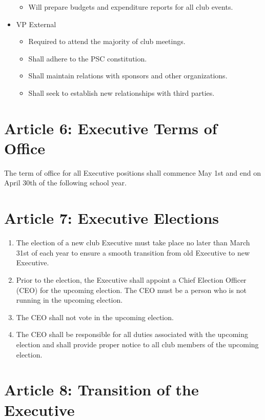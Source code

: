\documentclass{article}
\begin{document}
\begin{itemize}
\begin{itemize}
            \item Will prepare budgets and expenditure reports for all club events.
        \end{itemize}
    \item VP External
        \begin{itemize}
            \item Required to attend the majority of club meetings.
            \item Shall adhere to the PSC constitution.
            \item Shall maintain relations with sponsors and other organizations.
            \item Shall seek to establish new relationships with third parties.
        \end{itemize}
\end{itemize}

\section{Article 6: Executive Terms of Office}

The term of office for all Executive positions shall commence May 1st and end on April 30th of the following school year. 

\section{Article 7: Executive Elections}

\begin{enumerate}
    \item The election of a new club Executive must take place no later than March 31st of each year to ensure a smooth transition from old Executive to new Executive. 
    \item Prior to the election, the Executive shall appoint a Chief Election Officer (CEO) for the upcoming election. The CEO must be a person who is not running in the upcoming election. 
    \item The CEO shall not vote in the upcoming election. 
    \item The CEO shall be responsible for all duties associated with the upcoming election and shall provide proper notice to all club members of the upcoming election.
\end{enumerate}

\section{Article 8: Transition of the Executive}
\end{document}
